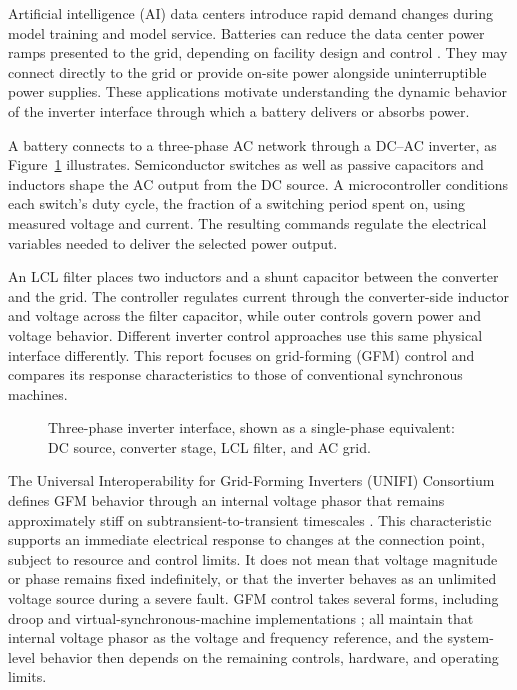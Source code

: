 \documentclass[11pt]{article}
\begin{document}
Artificial intelligence (AI) data centers introduce rapid demand changes during model training and model service. Batteries can reduce the data center power ramps presented to the grid, depending on facility design and control \cite{mohammadi2026}. They may connect directly to the grid or provide on-site power alongside uninterruptible power supplies. These applications motivate understanding the dynamic behavior of the inverter interface through which a battery delivers or absorbs power.

A battery connects to a three-phase AC network through a DC--AC inverter, as Figure~\ref{fig:invsymbol} illustrates. Semiconductor switches as well as passive capacitors and inductors shape the AC output from the DC source. A microcontroller conditions each switch's duty cycle, the fraction of a switching period spent on, using measured voltage and current. The resulting commands regulate the electrical variables needed to deliver the selected power output.

An LCL filter places two inductors and a shunt capacitor between the converter and the grid. The controller regulates current through the converter-side inductor and voltage across the filter capacitor, while outer controls govern power and voltage behavior. Different inverter control approaches use this same physical interface differently. This report focuses on grid-forming (GFM) control and compares its response characteristics to those of conventional synchronous machines.

\begin{figure}[b]\centering

\caption{Three-phase inverter interface, shown as a single-phase equivalent: DC source, converter stage, LCL filter, and AC grid.}
\label{fig:invsymbol}
\end{figure}

The Universal Interoperability for Grid-Forming Inverters (UNIFI) Consortium defines GFM behavior through an internal voltage phasor that remains approximately stiff on subtransient-to-transient timescales \cite{unifi2026}. This characteristic supports an immediate electrical response to changes at the connection point, subject to resource and control limits. It does not mean that voltage magnitude or phase remains fixed indefinitely, or that the inverter behaves as an unlimited voltage source during a severe fault. GFM control takes several forms, including droop and virtual-synchronous-machine implementations \cite{unifi2026,du2023a1,du2024b1}; all maintain that internal voltage phasor as the voltage and frequency reference, and the system-level behavior then depends on the remaining controls, hardware, and operating limits.
\end{document}

